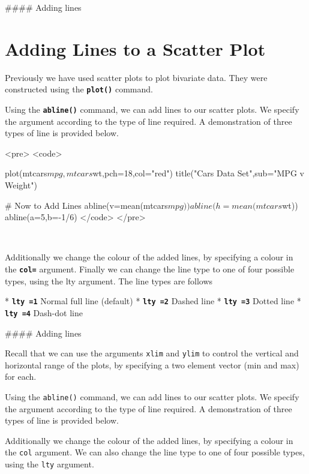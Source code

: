 
#### {Adding lines}



\section*{Adding Lines to a Scatter Plot}
Previously we have used scatter plots to plot bivariate data. They were constructed using the \texttt{\textbf{plot()}} command.  

Using the \texttt{\textbf{abline()}} command, we can add lines to our scatter plots. We specify the argument according to the type of line required. A demonstration of three types of line is provided below.



<pre>
<code>

plot(mtcars$mpg,mtcars$wt,pch=18,col="red")
title("Cars Data Set",sub="MPG v Weight")

# Now to Add Lines
abline(v=mean(mtcars$mpg))
abline(h=mean(mtcars$wt))
abline(a=5,b=-1/6)
</code>
</pre>

~%

Additionally we change the colour of the added lines, by specifying a colour in the \texttt{\textbf{col=}} argument. Finally we can change the line type to one of four possible types, using the lty argument.
The line types are follows 

* \texttt{\textbf{lty =1}}   Normal full line (default)
* \texttt{\textbf{lty =2}}  Dashed line 
* \texttt{\textbf{lty =3}}   Dotted line
* \texttt{\textbf{lty =4}}   Dash-dot line



#### {Adding lines}

Recall that we can use the arguments \texttt{xlim} and \texttt{ylim} to control the vertical and horizontal range of the plots, by specifying a two element vector (min and max) for each.

Using the \texttt{abline()} command, we can add lines to our scatter plots. We specify the argument according to the type of line required. A demonstration of three types of line is provided below.

Additionally we change the colour of the added lines, by specifying a colour in the \texttt{col} argument. We can also change the line type to one of four possible types, using the \texttt{lty} argument.

